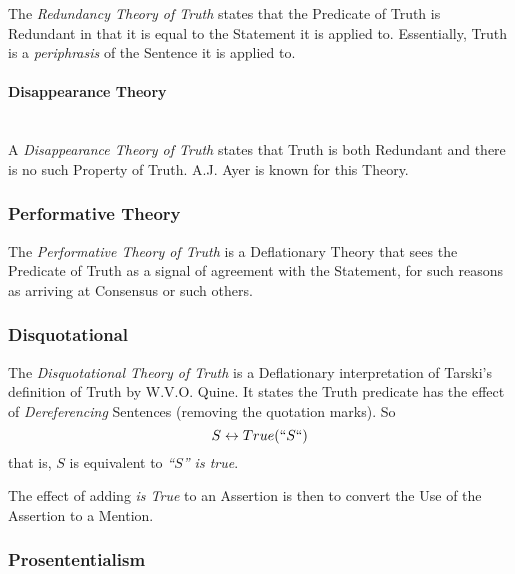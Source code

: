 \documentclass{article}
\begin{document}
The \emph{Redundancy Theory of Truth} states that the Predicate of
Truth is Redundant in that it is equal to the Statement it is applied
to.\cite{ramsey27} Essentially, Truth is a \emph{periphrasis} of the
Sentence it is applied to.

\paragraph{Disappearance Theory}
\hfill \\ A \emph{Disappearance Theory of Truth} states that Truth is
both Redundant and there is no such Property of Truth. A.J. Ayer is
known for this Theory.

\subsubsection{Performative Theory}

The \emph{Performative Theory of Truth} is a Deflationary Theory that
sees the Predicate of Truth as a signal of agreement with the
Statement, for such reasons as arriving at Consensus or such others.

\subsubsection{Disquotational}

The \emph{Disquotational Theory of Truth} is a Deflationary
interpretation of Tarski's definition of Truth by W.V.O. Quine. It
states the Truth predicate has the effect of \emph{Dereferencing}
Sentences (removing the quotation marks). So
\[
    S \leftrightarrow True(``S``)
\]
that is, $S$ is equivalent to \emph{``$S$'' is true}.

The effect of adding \emph{is True} to an Assertion is then to convert
the Use of the Assertion to a Mention.

\subsubsection{Prosententialism}
\end{document}
